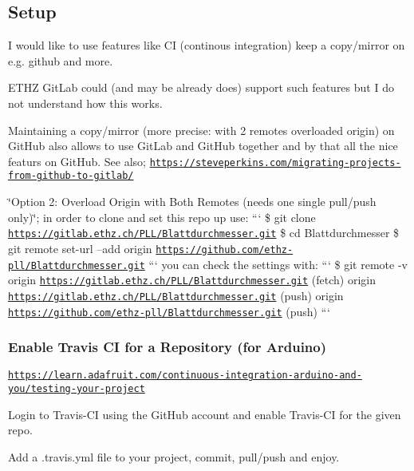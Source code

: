 \subsection*{Setup}

I would like to use features like C\-I (continous integration) keep a copy/mirror on e.\-g. github and more.

E\-T\-H\-Z Git\-Lab could (and may be already does) support such features but I do not understand how this works.

Maintaining a copy/mirror (more precise\-: with 2 remotes overloaded origin) on Git\-Hub also allows to use Git\-Lab and Git\-Hub together and by that all the nice featurs on Git\-Hub. See also; \href{https://steveperkins.com/migrating-projects-from-github-to-gitlab/}{\tt https\-://steveperkins.\-com/migrating-\/projects-\/from-\/github-\/to-\/gitlab/}

\char`\"{}\-Option 2\-: Overload Origin with Both Remotes (needs one single pull/push only)\char`\"{}; in order to clone and set this repo up use\-: ``` \$ git clone \href{https://gitlab.ethz.ch/PLL/Blattdurchmesser.git}{\tt https\-://gitlab.\-ethz.\-ch/\-P\-L\-L/\-Blattdurchmesser.\-git} \$ cd Blattdurchmesser \$ git remote set-\/url --add origin \href{https://github.com/ethz-pll/Blattdurchmesser.git}{\tt https\-://github.\-com/ethz-\/pll/\-Blattdurchmesser.\-git} ``` you can check the settings with\-: ``` \$ git remote -\/v origin \href{https://gitlab.ethz.ch/PLL/Blattdurchmesser.git}{\tt https\-://gitlab.\-ethz.\-ch/\-P\-L\-L/\-Blattdurchmesser.\-git} (fetch) origin \href{https://gitlab.ethz.ch/PLL/Blattdurchmesser.git}{\tt https\-://gitlab.\-ethz.\-ch/\-P\-L\-L/\-Blattdurchmesser.\-git} (push) origin \href{https://github.com/ethz-pll/Blattdurchmesser.git}{\tt https\-://github.\-com/ethz-\/pll/\-Blattdurchmesser.\-git} (push) ```

\subsubsection*{Enable Travis C\-I for a Repository (for Arduino)}

\href{https://learn.adafruit.com/continuous-integration-arduino-and-you/testing-your-project}{\tt https\-://learn.\-adafruit.\-com/continuous-\/integration-\/arduino-\/and-\/you/testing-\/your-\/project}

Login to Travis-\/\-C\-I using the Git\-Hub account and enable Travis-\/\-C\-I for the given repo.

Add a .travis.\-yml file to your project, commit, pull/push and enjoy.

